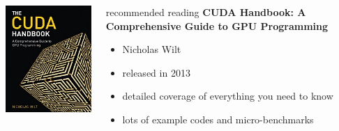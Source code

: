 \begin{frame}[fragile]{}
    \begin{columns}[T]
        \begin{column}{0.4\textwidth}
            \includegraphics[width=\textwidth]{./images/CUDA-Handbook-Cover208_260.jpg}
        \end{column}

        \begin{column}{0.6\textwidth}
            \begin{info}{recommended reading}
                \textbf{\small CUDA Handbook: A Comprehensive Guide to GPU Programming}
                \begin{itemize}
                    \item  Nicholas Wilt
                    \item  released in 2013
                    \item  detailed coverage of everything you need to know
                    \item  lots of example codes and micro-benchmarks
                \end{itemize}
            \end{info}
        \end{column}
    \end{columns}
    \begin{center}
    \end{center}
\end{frame}
